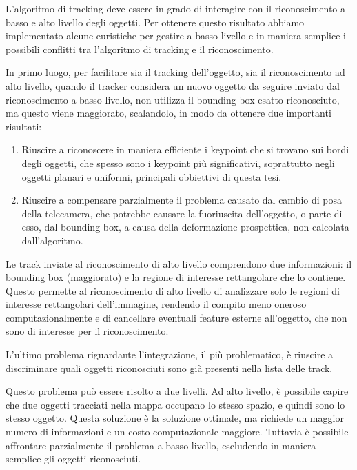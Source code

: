L'algoritmo di tracking deve essere in grado di interagire con il riconoscimento a basso e alto livello degli oggetti. Per ottenere questo risultato abbiamo implementato alcune euristiche per gestire a basso livello e in maniera semplice i possibili conflitti tra l'algoritmo di tracking e il riconoscimento.

In primo luogo, per facilitare sia il tracking dell'oggetto, sia il riconoscimento ad alto livello, quando il tracker considera un nuovo oggetto da seguire inviato dal riconoscimento a basso livello, non utilizza il bounding box esatto riconosciuto, ma questo viene maggiorato, scalandolo, in modo da ottenere due importanti risultati:

\begin{enumerate}
 \item Riuscire a riconoscere in maniera efficiente i keypoint che si trovano sui bordi degli oggetti, che spesso sono i keypoint più significativi, soprattutto negli oggetti planari e uniformi, principali obbiettivi di questa tesi.
 \item Riuscire a compensare parzialmente il problema causato dal cambio di posa della telecamera, che potrebbe causare la fuoriuscita dell'oggetto, o parte di esso, dal bounding box, a causa della deformazione prospettica, non calcolata dall'algoritmo.
\end{enumerate}

Le track inviate al riconoscimento di alto livello comprendono due informazioni: il bounding box (maggiorato) e la regione di interesse rettangolare che lo contiene. Questo permette al riconoscimento di alto livello di analizzare solo le regioni di interesse rettangolari dell'immagine, rendendo il compito meno oneroso computazionalmente e di cancellare eventuali feature esterne all'oggetto, che non sono di interesse per il riconoscimento.

L'ultimo problema riguardante l'integrazione, il più problematico, è riuscire a discriminare quali oggetti riconosciuti sono già presenti nella lista delle track.

Questo problema può essere risolto a due livelli. Ad alto livello, è possibile capire che due oggetti tracciati nella mappa occupano lo stesso spazio, e quindi sono lo stesso oggetto. Questa soluzione è la soluzione ottimale, ma richiede un maggior numero di informazioni e un costo computazionale maggiore. 
Tuttavia è possibile affrontare parzialmente il problema a basso livello, escludendo in maniera semplice gli oggetti riconosciuti. 

